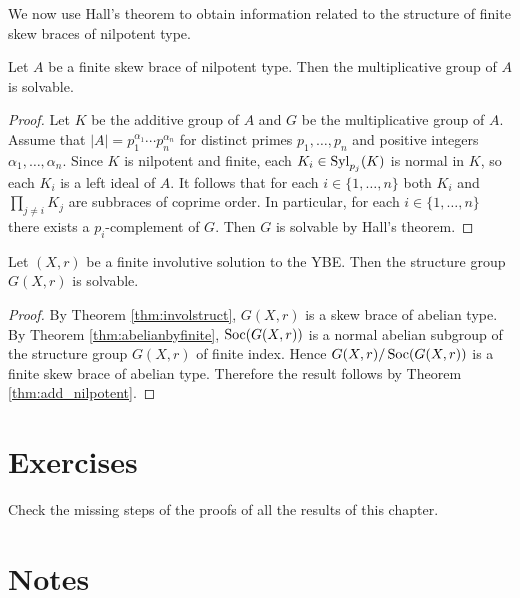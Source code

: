 We now use Hall's theorem to obtain information related to the
structure of finite skew braces of nilpotent type. 


\begin{theorem}
\label{thm:add_nilpotent}
Let $A$ be a finite skew brace of nilpotent type. Then 
the multiplicative group of $A$ is solvable.
\end{theorem}

\begin{proof}
    Let $K$ be the additive group of $A$ and $G$ be the multiplicative group of $A$. Assume
    that $|A|=p_1^{\alpha_1}\cdots p_n^{\alpha_n}$ for distinct primes $p_1,\dots,p_n$ and positive integers $\alpha_1,\dots ,\alpha_n$. 
    Since $K$ is nilpotent and finite, each $K_i\in\mathrm{Syl}_{p_j}(K)$ is normal in $K$, so 
    each $K_i$ is a left ideal of $A$. It follows that for each $i\in\{1,\dots,n\}$ both $K_i$ and 
    $\prod_{j\ne i}K_j$ are subbraces of coprime order. In particular, for 
    each $i\in\{1,\dots,n\}$ there exists a $p_i$-complement of $G$. 
    Then $G$ is solvable by Hall's theorem. 
\end{proof}

\begin{theorem}\label{thm:ESSsolvable}
Let $(X,r)$ be a finite involutive solution to the YBE. Then the structure group $G(X,r)$ is solvable.
\end{theorem}

\begin{proof}
By Theorem \ref{thm:involstruct}, $G(X,r)$ is a skew brace of abelian type. By Theorem \ref{thm:abelianbyfinite}, $\operatorname{Soc}(G(X,r))$ is a normal abelian subgroup of the structure group $G(X,r)$ of finite index. Hence $G(X,r)/\operatorname{Soc}(G(X,r))$ is a finite skew brace of abelian type. Therefore the result follows by Theorem \ref{thm:add_nilpotent}.  
\end{proof}

\section{Exercises}

\begin{prob}
Check the missing steps of the proofs of all the results of this chapter. 
\end{prob}

\section{Notes}